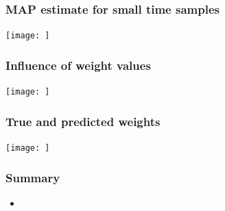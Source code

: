 \documentclass[final]{beamer}
\begin{document}
\begin{frame}
\frametitle{MAP estimate for small time samples}
\begin{center}
\texttt{[image: ]}
\end{center}
\end{frame}

\begin{frame}
\frametitle{Influence of weight values}
\begin{center}
\texttt{[image: ]}
\end{center}
\end{frame}

\begin{frame}
\frametitle{True and predicted weights}
\begin{center}
\texttt{[image: ]}
\end{center}
\end{frame}

\begin{frame}
	\frametitle{Summary}
	\begin{itemize}
		\item 
	\end{itemize}
\end{frame}
\end{document}
